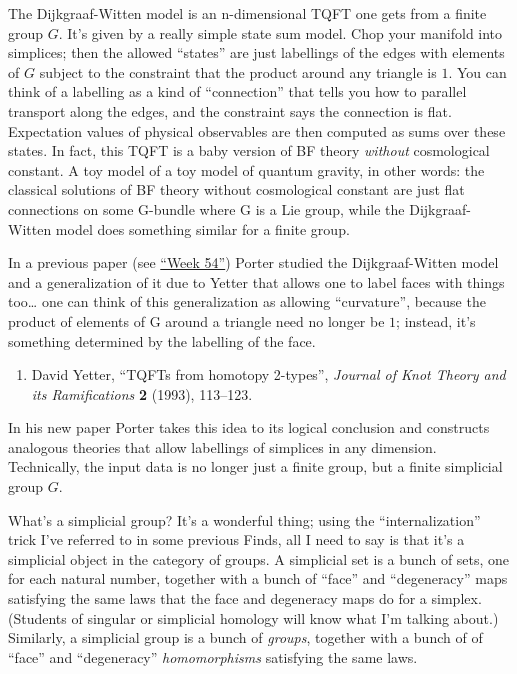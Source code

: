 \documentclass{article}
\def\tightlist{}
\begin{document}
The Dijkgraaf-Witten model is an n-dimensional TQFT one gets from a
finite group \(G\). It's given by a really simple state sum model. Chop
your manifold into simplices; then the allowed ``states'' are just
labellings of the edges with elements of \(G\) subject to the constraint
that the product around any triangle is \(1\). You can think of a
labelling as a kind of ``connection'' that tells you how to parallel
transport along the edges, and the constraint says the connection is
flat. Expectation values of physical observables are then computed as
sums over these states. In fact, this TQFT is a baby version of BF
theory \emph{without} cosmological constant. A toy model of a toy model
of quantum gravity, in other words: the classical solutions of BF theory
without cosmological constant are just flat connections on some G-bundle
where G is a Lie group, while the Dijkgraaf-Witten model does something
similar for a finite group.

In a previous paper (see \protect\hyperlink{week54}{``Week 54''}) Porter
studied the Dijkgraaf-Witten model and a generalization of it due to
Yetter that allows one to label faces with things too\ldots{} one can
think of this generalization as allowing ``curvature'', because the
product of elements of G around a triangle need no longer be \(1\);
instead, it's something determined by the labelling of the face.

\begin{enumerate}
\def\labelenumi{\arabic{enumi})}
\setcounter{enumi}{6}
\tightlist
\item
  David Yetter, ``TQFTs from homotopy 2-types'', \emph{Journal of Knot
  Theory and its Ramifications} \textbf{2} (1993), 113--123.
\end{enumerate}

In his new paper Porter takes this idea to its logical conclusion and
constructs analogous theories that allow labellings of simplices in any
dimension. Technically, the input data is no longer just a finite group,
but a finite simplicial group \(G\).

What's a simplicial group? It's a wonderful thing; using the
``internalization'' trick I've referred to in some previous Finds, all I
need to say is that it's a simplicial object in the category of groups.
A simplicial set is a bunch of sets, one for each natural number,
together with a bunch of ``face'' and ``degeneracy'' maps satisfying the
same laws that the face and degeneracy maps do for a simplex. (Students
of singular or simplicial homology will know what I'm talking about.)
Similarly, a simplicial group is a bunch of \emph{groups}, together with
a bunch of of ``face'' and ``degeneracy'' \emph{homomorphisms}
satisfying the same laws.
\end{document}
